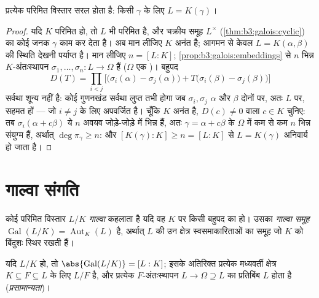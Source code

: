 \begin{theorem}[आद्य अवयव]\label{thm:b3:galois:primitive}
प्रत्येक परिमित \emph{} विस्तार सरल होता है: किसी $\gamma$ के
लिए $L =
K(\gamma)$।
\end{theorem}

\begin{proof}
यदि $K$ परिमित हो, तो $L$ भी परिमित है, और चक्रीय समूह
$L^\times$ (\cref{thm:b3:galois:cyclic}) का कोई जनक $\gamma$ काम कर देता है। अब मान लीजिए
$K$ अनंत है; आगमन से केवल $L =
K(\alpha, \beta)$ की स्थिति देखनी पर्याप्त है।
मान लीजिए $n = [L:K]$; \cref{prop:b3:galois:embeddings} से $n$ भिन्न $K$-अंतःस्थापन $\sigma_1, \dots, \sigma_n \colon L \to \Omega$
हैं ($\Omega$ एक )। बहुपद
\[
D(T)=\prod_{i<j}\bigl[\bigl(\sigma_i(\alpha)-\sigma_j(\alpha)
\bigr) + T\bigl(\sigma_i(\beta) - \sigma_j(\beta)\bigr)\bigr]
\]
सर्वथा शून्य नहीं है: कोई गुणनखंड सर्वथा लुप्त तभी होगा जब
$\sigma_i, \sigma_j$ $\alpha$ और $\beta$ दोनों पर, अतः $L$ पर, सहमत हों --- जो
$i \neq j$ के लिए अपवर्जित है। चूँकि $K$ अनंत है, $D(c) \ne 0$ वाला $c \in
K$
चुनिए: तब $\sigma_i(\alpha +
c\beta)$ ये $n$ अवयव जोड़े-जोड़े में भिन्न हैं, अतः
$\gamma = \alpha + c\beta$ के $\Omega$ में कम से कम $n$ भिन्न संयुग्म हैं, अर्थात्
$\deg \pi_\gamma \geq n$: और $[K(\gamma):K] \geq n = [L:K]$ से $L = K(\gamma)$ अनिवार्य हो जाता है।
\end{proof}

\section{गाल्वा संगति}

\begin{definition}\label{def:b3:galois:galois}
कोई परिमित विस्तार $L/K$ \emph{गाल्वा}
कहलाता है यदि वह $K$ पर किसी \emph{} बहुपद का  हो। उसका \emph{गाल्वा समूह} $\operatorname{Gal}(L/K) = \operatorname{Aut}_K(L)$ है,
अर्थात् $L$ की उन क्षेत्र स्वसमाकारिताओं का समूह जो $K$ को
बिंदुशः स्थिर रखती हैं।
\end{definition}

\begin{proposition}\label{prop:b3:galois:galoisorder}
यदि $L/K$  हो, तो $\abs{\operatorname{Gal}(L/K)} =
[L:K]$; इसके अतिरिक्त प्रत्येक मध्यवर्ती
क्षेत्र $K
\subseteq F \subseteq L$ के लिए $L/F$  है, और प्रत्येक
$F$-अंतःस्थापन $L \to \Omega
\supseteq L$ का प्रतिबिंब $L$ होता है
(\emph{प्रसामान्यता})।
\end{proposition}

